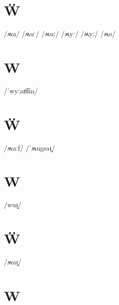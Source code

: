 \documentclass[10pt,a4paper,twoside]{book}
\begin{document}
\section*{Ẅ}

\begin{multicols}{3}
 {/ʍu/} {}
 {/ʍuˑ/} {}
 {/ʍuː/} {}
 {/ʍyˑ/} {}
 {/ʍyː/} {}
 {/ʍø/} {}
\end{multicols}

\section*{W}

\begin{multicols}{3}
 {/ˈwyːam͡m/} {}
\end{multicols}

\section*{Ẅ}

\begin{multicols}{3}
 {/ʍuːf/} {}
 {/ˈʍugsaɪ̯/} {}
\end{multicols}

\section*{W}

\begin{multicols}{3}
 {/wuɪ̯/} {}
\end{multicols}

\section*{Ẅ}

\begin{multicols}{3}
 {/ʍuɪ̯/} {}
\end{multicols}

\section*{W}
\end{document}
